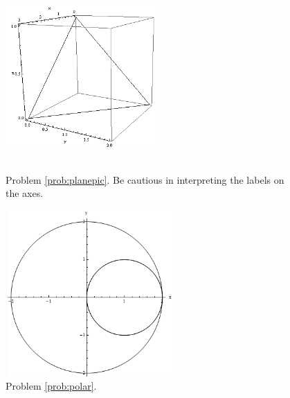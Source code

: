 \documentclass[12pt]{exam}
\begin{document}

        \begin{figure}[ht]
            \centering
            \begin{minipage}[t]{0.45\linewidth}
                \includegraphics[height=180pt,width=167pt]{f12_final_fig1}
                \caption{Problem \ref{prob:planepic}. Be cautious in interpreting the labels on the axes.}
            \end{minipage}
            \hspace{0.05\linewidth}
            \begin{minipage}[t]{0.45\linewidth}
            \centering
                \includegraphics[height=180pt,width=182pt]{f12_final_fig2}
                \caption{Problem \ref{prob:polar}.}
            \end{minipage}%
        \end{figure}
\end{document}
